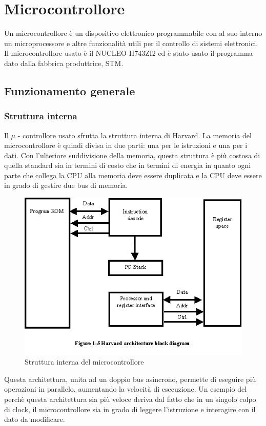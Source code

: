 \pagebreak
\section{Microcontrollore}
Un microcontrollore è un dispositivo elettronico programmabile con al suo interno un microprocessore e altre funzionalità utili per il controllo di sistemi elettronici.\\
Il microcontrollore usato  è il NUCLEO H743ZI2 ed è stato usato il programma dato dalla fabbrica produttrice, STM.\\
\subsection{Funzionamento generale}
\subsubsection{Struttura interna}
Il $\mu$ - controllore usato sfrutta la struttura interna di Harvard. La memoria del microcontrollore è quindi divisa in due parti: una per le istruzioni e una per i dati. Con l'ulteriore suddivisione della memoria, questa struttura è più costosa di quella standard sia in termini di costo che in termini di energia in quanto ogni parte che collega la CPU alla memoria deve essere duplicata e la CPU deve essere in grado di gestire due bus di memoria.\\
\begin{figure}[h]
    \centering
    \includegraphics[width=0.5\linewidth]{microcontrollore/assets/Harvard.png}
    \caption{Struttura interna del microcontrollore}
\end{figure}
Questa architettura, unita ad un doppio bus asincrono, permette di eseguire più operazioni in parallelo, aumentando la velocità di esecuzione. Un esempio del perchè questa architettura sia più veloce deriva dal fatto che in un singolo colpo di clock, il microcontrollore sia in grado di leggere l'istruzione e interagire con il dato da modificare.\\

